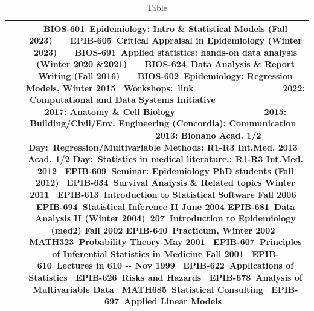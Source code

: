 \documentclass{article}%
\begin{document}
\begin{table}[h!]%
\caption{Table}%
\begin{tabular}{|c|c|c|}%
\hline%
&&BIOS{-}601~Epidemiology: Intro \& Statistical Models (Fall 2023)~~~\newline%
EPIB{-}605~Critical Appraisal in Epidemiology (Winter 2023)~~~\newline%
BIOS{-}691~Applied statistics: hands{-}on data analysis (Winter 2020 \&2021)~~~\newline%
BIOS{-}624~Data Analysis \& Report Writing (Fall 2016)~~~\newline%
BIOS{-}602~Epidemiology: Regression Models, Winter 2015~\newline%
Workshops:~link\newline%
~~~~~~~~~~~~~~~~~ 2022: Computational and Data Systems Initiative\newline%
~~~~~~~~~~~~~~~~~ 2017: Anatomy \& Cell Biology\newline%
~~~~~~~~~~~~~~~~~ 2015: Building/Civil/Env. Engineering (Concordia): Communication~\newline%
~~~~~~~~~~~~~~~~~ 2013: Bionano\newline%
Acad. 1/2 Day:~Regression/Multivariable Methods: R1{-}R3 Int.Med. 2013~\newline%
Acad. 1/2 Day:~Statistics in medical literature.: R1{-}R3 Int.Med. 2012~\newline%
EPIB{-}609~Seminar: Epidemiology PhD students (Fall 2012)~\newline%
EPIB{-}634~Survival Analysis \& Related topics Winter 2011~\newline%
EPIB{-}613~Introduction to Statistical Software Fall 2006~\newline%
EPIB{-}694~Statistical Inference II June 2004\newline%
EPIB{-}681~Data Analysis II (Winter 2004)~\newline%
524{-}207~Introduction to Epidemiology (med2) Fall 2002\newline%
EPIB{-}640~Practicum, Winter 2002~\newline%
MATH323~Probability Theory May 2001~\newline%
EPIB{-}607~Principles of Inferential Statistics in Medicine Fall 2001~\newline%
EPIB{-}610~Lectures in 610 {-}{-} Nov 1999~\newline%
EPIB{-}622~Applications of Statistics~\newline%
EPIB{-}626~Risks and Hazards~\newline%
EPIB{-}678~Analysis of Multivariable Data~\newline%
MATH685~Statistical Consulting~\newline%
EPIB{-}697~Applied Linear Models~\\%
\hline%
\end{tabular}%
\end{table}
\end{document}
